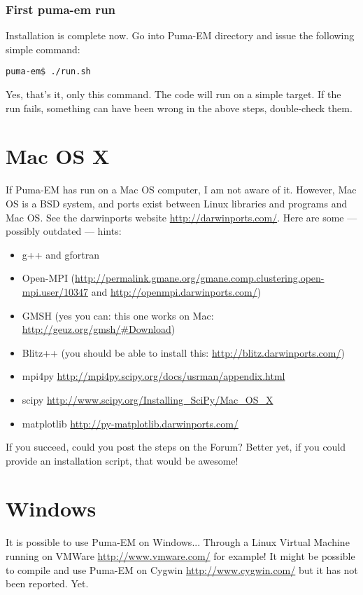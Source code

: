 \documentclass[a4paper,10pt]{book}
\begin{document}
\subsubsection{First puma-em run}
%
\par
Installation is complete now. Go into Puma-EM directory and issue the following simple command:
\begin{verbatim}
puma-em$ ./run.sh
\end{verbatim}
Yes, that's it, only this command. The code will run on a simple target. If the run fails, something can have been wrong in the above steps, double-check them.

\section{Mac OS X}
%
\par
If Puma-EM has run on a Mac OS computer, I am not aware of it. However, Mac OS is a BSD system, and ports exist between Linux libraries and programs and Mac OS. See the darwinports website \url{http://darwinports.com/}. Here are some --- possibly outdated --- hints:
\begin{itemize}
\item g++ and gfortran
\item Open-MPI (\url{http://permalink.gmane.org/gmane.comp.clustering.open-mpi.user/10347} and \url{http://openmpi.darwinports.com/})
\item GMSH (yes you can: this one works on Mac: \url{http://geuz.org/gmsh/#Download})
\item Blitz++ (you should be able to install this: \url{http://blitz.darwinports.com/})
\item mpi4py \url{http://mpi4py.scipy.org/docs/usrman/appendix.html}
\item scipy \url{http://www.scipy.org/Installing_SciPy/Mac_OS_X}
\item matplotlib \url{http://py-matplotlib.darwinports.com/}
\end{itemize}
If you succeed, could you post the steps on the Forum? Better yet, if you could provide an installation script, that would be awesome!


\section{Windows}
%
\par
It is possible to use Puma-EM on Windows... Through a Linux Virtual Machine running on VMWare \url{http://www.vmware.com/} for example! It might be possible to compile and use Puma-EM on Cygwin \url{http://www.cygwin.com/} but it has not been reported. Yet. 
\end{document}
